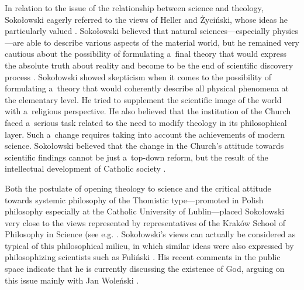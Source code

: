 \documentclass[%
  manuscript=article,
  year=2024,
  volume=77,
  doi=00000.000,
]{zfn}
\begin{document}
In relation to the issue of the relationship between science and theology, Sokołowski eagerly referred to the views of Heller and Życiński, whose ideas he particularly valued 
\parencites[see,][]{Sokoowski1993Koscio}[][p.187]{Sokoowski2014Czy}. %
 Sokołowski believed that natural sciences---especially physics---are able to describe various aspects of the material world, but he remained very cautious about the possibility of formulating a~final theory that would express the absolute truth about reality and become to be the end of scientific discovery process 
\parencite[][]{Sokoowski2011O}. %
 Sokołowski showed skepticism when it comes to the possibility of formulating a~theory that would coherently describe all physical phenomena at the elementary level. He tried to supplement the scientific image of the world with a~religious perspective. He also believed that the institution of the Church faced a~serious task related to the need to modify theology in its philosophical layer. Such a~change requires taking into account the achievements of modern science. Sokołowski believed that the change in the Church's attitude towards scientific findings cannot be just a~top-down reform, but the result of the intellectual development of Catholic society 
\parencite[][p.123]{Sokoowski1993Koscio}.%




Both the postulate of opening theology to science and the critical attitude towards systemic philosophy of the Thomistic type---promoted in Polish philosophy especially at the Catholic University of Lublin---placed Sokołowski very close to the views represented by representatives of the Kraków School of Philosophy in Science (see e.g. 
\parencites[][pp.228–229]{Trombik2021Koncepcje}[][]{Trombik2022Teologia}. %
 Sokołowski's views can actually be considered as typical of this philosophical milieu, in which similar ideas were also expressed by philosophizing scientists such as Fuliński 
\parencite[][]{Trombik2023Andrzej}. %
 His recent comments in the public space indicate that he is currently discussing the existence of God, arguing on this issue mainly with Jan Woleński 
\parencite[][]{Sokoowski2024Polscy}.%
\end{document}
